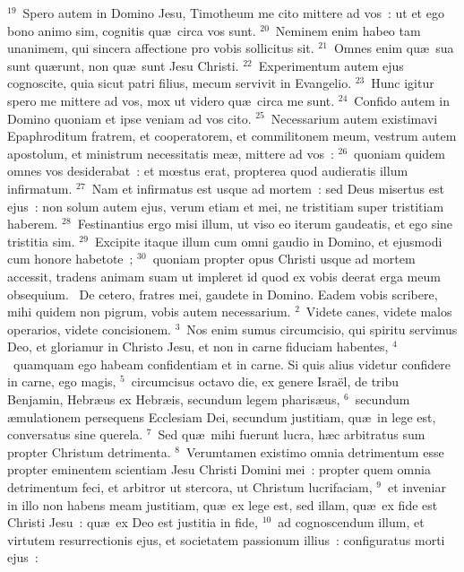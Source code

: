 ${}^{19}$~Spero autem in Domino Jesu, Timotheum me cito mittere ad vos~: ut et ego bono animo sim, cognitis qu\ae\ circa vos sunt.
${}^{20}$~Neminem enim habeo tam unanimem, qui sincera affectione pro vobis sollicitus sit.
${}^{21}$~Omnes enim qu\ae\ sua sunt qu\ae runt, non qu\ae\ sunt Jesu Christi.
${}^{22}$~Experimentum autem ejus cognoscite, quia sicut patri filius, mecum servivit in Evangelio.
${}^{23}$~Hunc igitur spero me mittere ad vos, mox ut videro qu\ae\ circa me sunt.
${}^{24}$~Confido autem in Domino quoniam et ipse veniam ad vos cito.
${}^{25}$~Necessarium autem existimavi Epaphroditum fratrem, et cooperatorem, et commilitonem meum, vestrum autem apostolum, et ministrum necessitatis me\ae , mittere ad vos~:
${}^{26}$~quoniam quidem omnes vos desiderabat~: et mœstus erat, propterea quod audieratis illum infirmatum.
${}^{27}$~Nam et infirmatus est usque ad mortem~: sed Deus misertus est ejus~: non solum autem ejus, verum etiam et mei, ne tristitiam super tristitiam haberem.
${}^{28}$~Festinantius ergo misi illum, ut viso eo iterum gaudeatis, et ego sine tristitia sim.
${}^{29}$~Excipite itaque illum cum omni gaudio in Domino, et ejusmodi cum honore habetote~;
${}^{30}$~quoniam propter opus Christi usque ad mortem accessit, tradens animam suam ut impleret id quod ex vobis deerat erga meum obsequium.
~De cetero, fratres mei, gaudete in Domino. Eadem vobis scribere, mihi quidem non pigrum, vobis autem necessarium.
${}^{2}$~Videte canes, videte malos operarios, videte concisionem.
${}^{3}$~Nos enim sumus circumcisio, qui spiritu servimus Deo, et gloriamur in Christo Jesu, et non in carne fiduciam habentes,
${}^{4}$~quamquam ego habeam confidentiam et in carne. Si quis alius videtur confidere in carne, ego magis,
${}^{5}$~circumcisus octavo die, ex genere Isra\"el, de tribu Benjamin, Hebr\ae us ex Hebr\ae is, secundum legem pharis\ae us,
${}^{6}$~secundum \ae mulationem persequens Ecclesiam Dei, secundum justitiam, qu\ae\ in lege est, conversatus sine querela.
${}^{7}$~Sed qu\ae\ mihi fuerunt lucra, h\ae c arbitratus sum propter Christum detrimenta.
${}^{8}$~Verumtamen existimo omnia detrimentum esse propter eminentem scientiam Jesu Christi Domini mei~: propter quem omnia detrimentum feci, et arbitror ut stercora, ut Christum lucrifaciam,
${}^{9}$~et inveniar in illo non habens meam justitiam, qu\ae\ ex lege est, sed illam, qu\ae\ ex fide est Christi Jesu~: qu\ae\ ex Deo est justitia in fide,
${}^{10}$~ad cognoscendum illum, et virtutem resurrectionis ejus, et societatem passionum illius~: configuratus morti ejus~:
